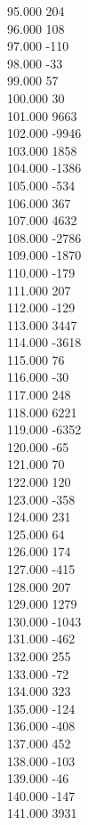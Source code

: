 { 95.000	204 \\
 96.000	108 \\
 97.000	-110 \\
 98.000	-33 \\
 99.000	57 \\
 100.000	30 \\
 101.000	9663 \\
 102.000	-9946 \\
 103.000	1858 \\
 104.000	-1386 \\
 105.000	-534 \\
 106.000	367 \\
 107.000	4632 \\
 108.000	-2786 \\
 109.000	-1870 \\
 110.000	-179 \\
 111.000	207 \\
 112.000	-129 \\
 113.000	3447 \\
 114.000	-3618 \\
 115.000	76 \\
 116.000	-30 \\
 117.000	248 \\
 118.000	6221 \\
 119.000	-6352 \\
 120.000	-65 \\
 121.000	70 \\
 122.000	120 \\
 123.000	-358 \\
 124.000	231 \\
 125.000	64 \\
 126.000	174 \\
 127.000	-415 \\
 128.000	207 \\
 129.000	1279 \\
 130.000	-1043 \\
 131.000	-462 \\
 132.000	255 \\
 133.000	-72 \\
 134.000	323 \\
 135.000	-124 \\
 136.000	-408 \\
 137.000	452 \\
 138.000	-103 \\
 139.000	-46 \\
 140.000	-147 \\
 141.000	3931 \\
}

